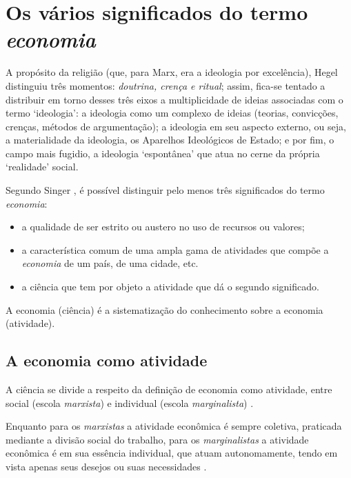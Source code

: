 \documentclass[
	12pt,				%
	oneside,			%
	a4paper,			%
	chapter=TITLE,		%
	section=TITLE,		%
	english,			%
	brazil				%
	]{abntex2}
\begin{document}
\section{\texorpdfstring{Os vários significados do termo
\emph{economia}}{Os vários significados do termo }}\label{os-vuxe1rios-significados-do-termo}
\begin{citacao}
A propósito da religião (que, para Marx, era a ideologia por excelência), Hegel
distinguiu três momentos: \emph{doutrina, crença e ritual}; assim, fica-se
tentado a distribuir em torno desses três eixos a multiplicidade de ideias
associadas com o termo `ideologia': a ideologia como um complexo de ideias
(teorias, convicções, crenças, métodos de argumentação); a ideologia em seu
aspecto externo, ou seja, a materialidade da ideologia, os Aparelhos Ideológicos
de Estado; e por fim, o campo mais fugidio, a ideologia `espontânea' que atua
no cerne da própria `realidade' social.
\cite[p.~15]{zizek}
\end{citacao}
Segundo Singer \autocite*[7]{singer}, é possível distinguir pelo menos
três significados do termo \emph{economia}:
\begin{itemize}
\tightlist
\item
  a qualidade de ser estrito ou austero no uso de recursos ou valores;
\item
  a característica comum de uma ampla gama de atividades que compõe a
  \emph{economia} de um país, de uma cidade, etc.
\item
  a ciência que tem por objeto a atividade que dá o segundo significado.
\end{itemize}
A economia (ciência) é a sistematização do conhecimento sobre a economia
(atividade).

\subsection{A economia como atividade}\label{a-economia-como-atividade}

A ciência se divide a respeito da definição de economia como atividade,
entre social (escola \emph{marxista}) e individual (escola
\emph{marginalista}) \autocite[9]{singer}.

Enquanto para os \emph{marxistas} a atividade econômica é sempre
coletiva, praticada mediante a divisão social do trabalho, para os
\emph{marginalistas} a atividade econômica é em sua essência individual,
que atuam autonomamente, tendo em vista apenas seus desejos ou suas
necessidades \autocite[10]{singer}.
\end{document}
